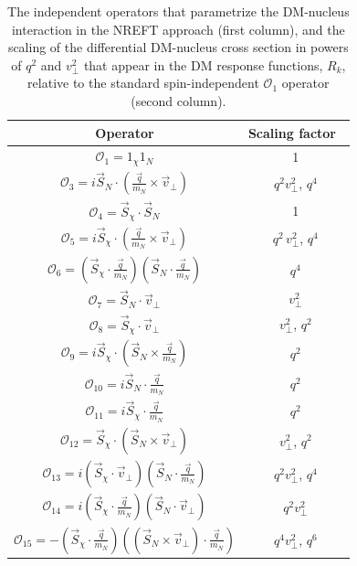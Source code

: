 \documentclass[a4paper,11pt]{article}
\begin{document}
\renewcommand{\arraystretch}{2}
\begin{table}
\centering
\begin{tabular}{|c|c|}
\hline
{Operator} & {Scaling factor}   \,  \\ 
 \hline
       $\mathcal{O}_1=1_\chi 1_N$ & 1  \\
       $\mathcal{O}_3=i \vec S_N \cdot \left(\frac{\vec q}{m_N} \times \vec v_{\perp}\right)$ &  $q^2 v_\perp^2$, $q^4$ \\
       $\mathcal{O}_4=\vec S_\chi \cdot \vec S_N$ & 1  \\
       $\mathcal{O}_5=i \vec S_\chi \cdot \left(\frac{\vec q}{m_N} \times \vec v_{\perp}\right)$ & $q^2\,  v_\perp^2$, $q^4$  \\
       $\mathcal{O}_6=\left(\vec S_\chi \cdot \frac{\vec q}{m_N} \right) \left(\vec S_N \cdot \frac{\vec q}{m_N} \right)$  & $q^4$  \\
       $\mathcal{O}_7=\vec S_N \cdot \vec v_\perp$ & $v_\perp^2$   \\
       $\mathcal{O}_8=\vec S_\chi \cdot \vec v_\perp$ & $v_\perp^2$, $q^2$ \\
       $\mathcal{O}_9=i \vec S_\chi \cdot \left(\vec S_N \times \frac{\vec q}{m_N}\right)$ & $q^2$  \\
       $\mathcal{O}_{10}=i \vec S_N \cdot \frac{\vec q}{m_N}$ & $q^2$  \\
       $\mathcal{O}_{11}=i \vec S_\chi \cdot \frac{\vec q}{m_N}$ & $q^2$ \\
       $\mathcal{O}_{12}=\vec S_\chi \cdot \left(\vec S_N \times \vec v_\perp \right)$ & $v_\perp^2$, $q^2$ \\
       $\mathcal{O}_{13}=i\left(\vec S_\chi \cdot \vec v_\perp \right) \left(\vec S_N \cdot \frac{\vec q}{m_N} \right)$ & $q^2 v_\perp^2$, $q^4$  \\
       $\mathcal{O}_{14}=i\left(\vec S_\chi \cdot \frac{\vec q}{m_N} \right) \left(\vec S_N \cdot \vec v_\perp \right)$ & $q^2 v_\perp^2$  \\
       $\mathcal{O}_{15}=-\left(\vec S_\chi \cdot \frac{\vec q}{m_N} \right) \left(\left(\vec S_N \times \vec v_\perp \right)\cdot \frac{\vec q}{m_N}\right)$ & $q^4 v_\perp^2$, $q^6$  \\
\hline
\end{tabular}
\caption{\label{tab:operators} The independent operators that parametrize the DM-nucleus interaction in the NREFT approach (first column), and the scaling of the differential DM-nucleus cross section in powers of $q^2$ and $v_\perp^2$ that appear in the DM response functions, $R_k$, relative to the standard spin-independent $\mathcal{O}_1$ operator (second column).}
\end{table}
\end{document}
